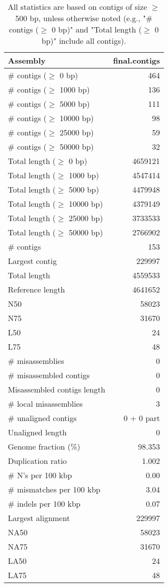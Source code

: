 \documentclass[12pt,a4paper]{article}
\begin{document}
\begin{table}[ht]
\begin{center}
\caption{All statistics are based on contigs of size $\geq$ 500 bp, unless otherwise noted (e.g., "\# contigs ($\geq$ 0 bp)" and "Total length ($\geq$ 0 bp)" include all contigs).}
\begin{tabular}{|l*{1}{|r}|}
\hline
Assembly & final.contigs \\ \hline
\# contigs ($\geq$ 0 bp) & 464 \\ \hline
\# contigs ($\geq$ 1000 bp) & 136 \\ \hline
\# contigs ($\geq$ 5000 bp) & 111 \\ \hline
\# contigs ($\geq$ 10000 bp) & 98 \\ \hline
\# contigs ($\geq$ 25000 bp) & 59 \\ \hline
\# contigs ($\geq$ 50000 bp) & 32 \\ \hline
Total length ($\geq$ 0 bp) & 4659121 \\ \hline
Total length ($\geq$ 1000 bp) & 4547414 \\ \hline
Total length ($\geq$ 5000 bp) & 4479948 \\ \hline
Total length ($\geq$ 10000 bp) & 4379149 \\ \hline
Total length ($\geq$ 25000 bp) & 3733533 \\ \hline
Total length ($\geq$ 50000 bp) & 2766902 \\ \hline
\# contigs & 153 \\ \hline
Largest contig & 229997 \\ \hline
Total length & 4559533 \\ \hline
Reference length & 4641652 \\ \hline
N50 & 58023 \\ \hline
N75 & 31670 \\ \hline
L50 & 24 \\ \hline
L75 & 48 \\ \hline
\# misassemblies & 0 \\ \hline
\# misassembled contigs & 0 \\ \hline
Misassembled contigs length & 0 \\ \hline
\# local misassemblies & 3 \\ \hline
\# unaligned contigs & 0 + 0 part \\ \hline
Unaligned length & 0 \\ \hline
Genome fraction (\%) & 98.353 \\ \hline
Duplication ratio & 1.002 \\ \hline
\# N's per 100 kbp & 0.00 \\ \hline
\# mismatches per 100 kbp & 3.04 \\ \hline
\# indels per 100 kbp & 0.07 \\ \hline
Largest alignment & 229997 \\ \hline
NA50 & 58023 \\ \hline
NA75 & 31670 \\ \hline
LA50 & 24 \\ \hline
LA75 & 48 \\ \hline
\end{tabular}
\end{center}
\end{table}
\end{document}
